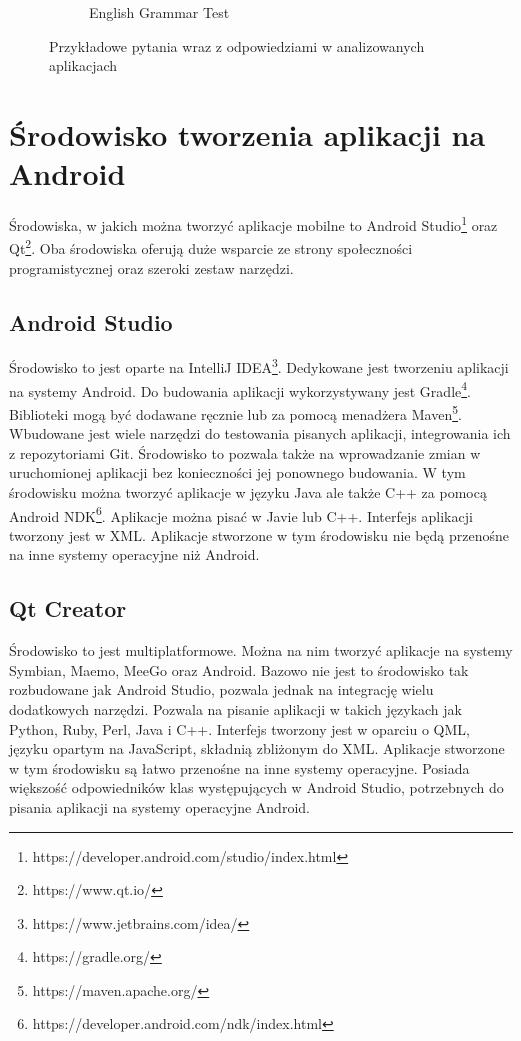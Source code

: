 \documentclass{report}
\begin{document}
\begin{figure}[ht]
\begin{subfigure}{.3\textwidth}
				\caption{English Grammar Test}
				\label{fig:english_grammar_test}
			\end{subfigure}
			\caption{Przykładowe pytania wraz z odpowiedziami w analizowanych aplikacjach}
			\label{fig:przykladowe_aplikacje}
		\end{figure}
	
		\section{Środowisko tworzenia aplikacji na Android}
		Środowiska, w jakich można tworzyć aplikacje mobilne to Android Studio\footnote{https://developer.android.com/studio/index.html} oraz Qt\footnote{https://www.qt.io/}. Oba środowiska oferują duże wsparcie ze strony społeczności programistycznej oraz szeroki zestaw narzędzi.
		
			\subsection{Android Studio}
			Środowisko to jest oparte na IntelliJ IDEA\footnote{https://www.jetbrains.com/idea/}. Dedykowane jest tworzeniu aplikacji na systemy Android. Do budowania aplikacji wykorzystywany jest Gradle\footnote{https://gradle.org/}. Biblioteki mogą być dodawane ręcznie lub za pomocą menadżera Maven\footnote{https://maven.apache.org/}. Wbudowane jest wiele narzędzi do testowania pisanych aplikacji, integrowania ich z repozytoriami Git. Środowisko to pozwala także na wprowadzanie zmian w uruchomionej aplikacji bez konieczności jej ponownego budowania. W tym środowisku można tworzyć aplikacje w języku Java ale także C++ za pomocą Android NDK\footnote{https://developer.android.com/ndk/index.html}. Aplikacje można pisać w Javie lub C++. Interfejs aplikacji tworzony jest w XML. Aplikacje stworzone w tym środowisku nie będą przenośne na inne systemy operacyjne niż Android.
			
			\subsection{Qt Creator}
			Środowisko to jest multiplatformowe. Można na nim tworzyć aplikacje na systemy Symbian, Maemo, MeeGo oraz Android. Bazowo nie jest to środowisko tak rozbudowane jak Android Studio, pozwala jednak na integrację wielu dodatkowych narzędzi. Pozwala na pisanie aplikacji w takich językach jak Python, Ruby, Perl, Java i C++. Interfejs tworzony jest w oparciu o QML, języku opartym na JavaScript, składnią zbliżonym do XML. Aplikacje stworzone w tym środowisku są łatwo przenośne na inne systemy operacyjne. Posiada większość odpowiedników klas występujących w Android Studio, potrzebnych do pisania aplikacji na systemy operacyjne Android.
	
\end{document}
